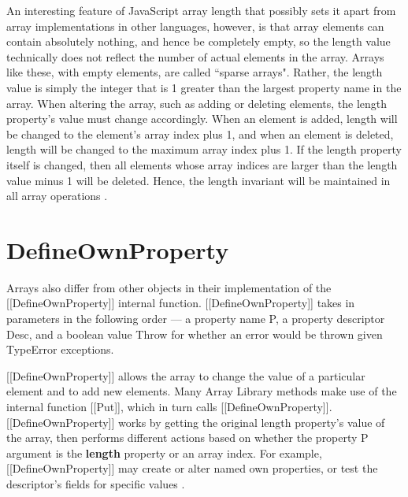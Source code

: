 \documentclass[a4paper,11pt,twoside]{report}
\begin{document}
An interesting feature of JavaScript array length that possibly sets it apart from array implementations in other languages, however, is that array elements can contain absolutely nothing, and hence be completely empty, so the length value technically does not reflect the number of actual elements in the array. Arrays like these, with empty elements, are called ``sparse arrays". Rather, the length value is simply the integer that is 1 greater than the largest property name in the array. When altering the array, such as adding or deleting elements, the length property's value must change accordingly. When an element is added, length will be changed to the element's array index plus 1, and when an element is deleted, length will be changed to the maximum array index plus 1. If the length property itself is changed, then all elements whose array indices are larger than the length value minus 1 will be deleted. Hence, the length invariant will be maintained in all array operations \cite{EcmaScript}.

\section{DefineOwnProperty}
Arrays also differ from other objects in their implementation of the [[DefineOwnProperty]] internal function. [[DefineOwnProperty]] takes in parameters in the following order --- a property name P, a property descriptor Desc, and a boolean value Throw for whether an error would be thrown given TypeError exceptions. 

[[DefineOwnProperty]] allows the array to change the value of a particular element and to add new elements. Many Array Library methods make use of the internal function [[Put]], which in turn calls [[DefineOwnProperty]]. [[DefineOwnProperty]] works by getting the original length property's value of the array, then performs different actions based on whether the property P argument is the \textbf{length} property or an array index. For example, [[DefineOwnProperty]] may create or alter named own properties, or test the descriptor's fields for specific values \cite{EcmaScript}.
\end{document}
